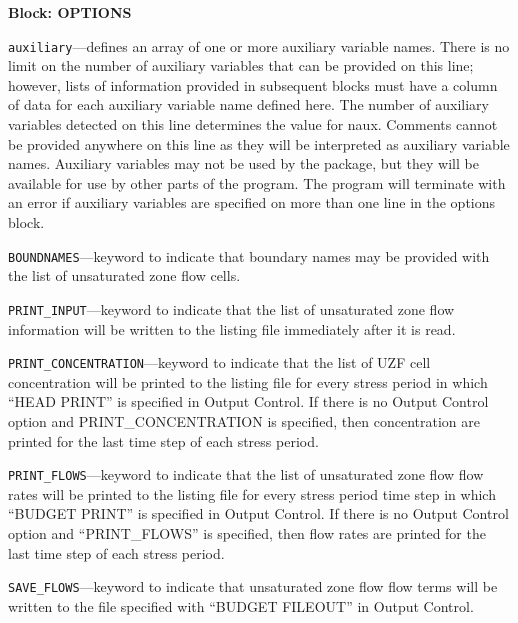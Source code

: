 
\item \textbf{Block: OPTIONS}

\begin{description}
\item \texttt{auxiliary}---defines an array of one or more auxiliary variable names.  There is no limit on the number of auxiliary variables that can be provided on this line; however, lists of information provided in subsequent blocks must have a column of data for each auxiliary variable name defined here.   The number of auxiliary variables detected on this line determines the value for naux.  Comments cannot be provided anywhere on this line as they will be interpreted as auxiliary variable names.  Auxiliary variables may not be used by the package, but they will be available for use by other parts of the program.  The program will terminate with an error if auxiliary variables are specified on more than one line in the options block.

\item \texttt{BOUNDNAMES}---keyword to indicate that boundary names may be provided with the list of unsaturated zone flow cells.

\item \texttt{PRINT\_INPUT}---keyword to indicate that the list of unsaturated zone flow information will be written to the listing file immediately after it is read.

\item \texttt{PRINT\_CONCENTRATION}---keyword to indicate that the list of UZF cell concentration will be printed to the listing file for every stress period in which ``HEAD PRINT'' is specified in Output Control.  If there is no Output Control option and PRINT\_CONCENTRATION is specified, then concentration are printed for the last time step of each stress period.

\item \texttt{PRINT\_FLOWS}---keyword to indicate that the list of unsaturated zone flow flow rates will be printed to the listing file for every stress period time step in which ``BUDGET PRINT'' is specified in Output Control.  If there is no Output Control option and ``PRINT\_FLOWS'' is specified, then flow rates are printed for the last time step of each stress period.

\item \texttt{SAVE\_FLOWS}---keyword to indicate that unsaturated zone flow flow terms will be written to the file specified with ``BUDGET FILEOUT'' in Output Control.


\end{description}
